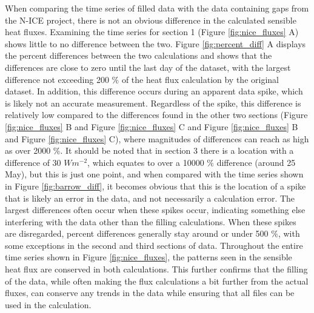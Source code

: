 When comparing the time series of filled data with the data containing gaps from the N-ICE project, there is not an obvious difference in the calculated sensible heat fluxes. Examining the time series for section 1 (Figure \ref{fig:nice_fluxes} A) shows little to no difference between the two. Figure \ref{fig:percent_diff} A displays the percent differences between the two calculations and shows that the differences are close to zero until the last day of the dataset, with the largest difference not exceeding 200 $\%$ of the heat flux calculation by the original dataset. In addition, this difference occurs during an apparent data spike, which is likely not an accurate measurement. Regardless of the spike, this difference is relatively low compared to the differences found in the other two sections (Figure \ref{fig:nice_fluxes} B and Figure \ref{fig:nice_fluxes} C and Figure \ref{fig:nice_fluxes} B and Figure \ref{fig:nice_fluxes} C), where magnitudes of differences can reach as high as over 2000 $\%$. It should be noted that in section 3 there is a location with a difference of 30 $Wm^{-2}$, which equates to over a 10000 $\%$ difference (around 25 May), but this is just one point, and when compared with the time series shown in Figure \ref{fig:barrow_diff}, it becomes obvious that this is the location of a spike that is likely an error in the data, and not necessarily a calculation error. The largest differences often occur when these spikes occur, indicating something else interfering with the data other than the filling calculations. When these spikes are disregarded, percent differences generally stay around or under 500 $\%$, with some exceptions in the second and third sections of data. Throughout the entire time series shown in Figure \ref{fig:nice_fluxes}, the patterns seen in the sensible heat flux are conserved in both calculations. This further confirms that the filling of the data, while often making the flux calculations a bit further from the actual fluxes, can conserve any trends in the data while ensuring that all files can be used in the calculation. 

